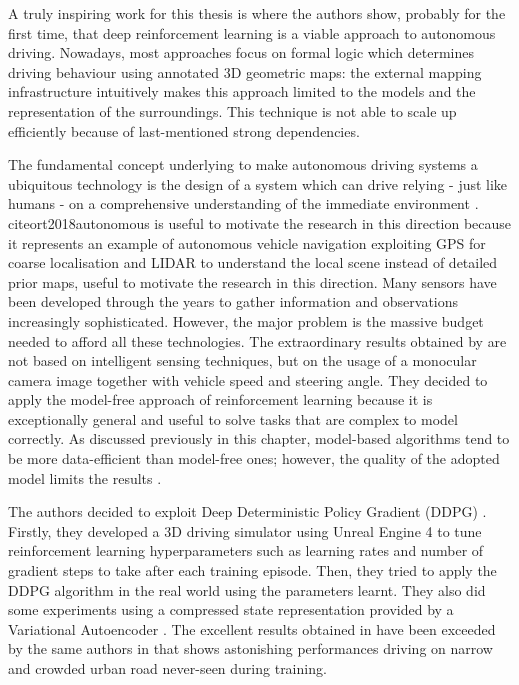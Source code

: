A truly inspiring work for this thesis is \cite{kendall2019learning} where the authors show, probably for the first time, that deep reinforcement learning is a viable approach to autonomous driving. Nowadays,  most approaches focus on formal logic which determines driving behaviour using annotated 3D geometric maps: the external mapping infrastructure intuitively makes this approach limited to the models and the representation of the surroundings.
This technique is not able to scale up efficiently because of last-mentioned strong dependencies.

The fundamental concept underlying \cite{kendall2019learning} to make autonomous driving systems a ubiquitous technology is the design of a system which can drive relying - just like humans - on a comprehensive understanding of the immediate environment \cite{badrinarayanan2017segnet}.
\\cite{ort2018autonomous} is useful to motivate the research in this direction because it represents an example of autonomous vehicle navigation exploiting GPS for coarse localisation and LIDAR to understand the local scene instead of detailed prior maps, useful to motivate the research in this direction.
Many sensors have been developed through the years to gather information and observations increasingly sophisticated. However, the major problem is the massive budget needed to afford all these technologies.
The extraordinary results obtained by \cite{kendall2019learning} are not based on intelligent sensing techniques, but on the usage of a monocular camera image together with vehicle speed and steering angle.
They decided to apply the model-free approach of reinforcement learning because it is exceptionally general and useful to solve tasks that are complex to model correctly. As discussed previously in this chapter, model-based algorithms tend to be more data-efficient than model-free ones; however, the quality of the adopted model limits the results \cite{deisenroth2011pilco}.

The authors decided to exploit Deep Deterministic Policy Gradient (DDPG) \cite{lillicrap2015continuous}.
Firstly, they developed a 3D driving simulator using Unreal Engine 4 to tune reinforcement learning hyperparameters such as learning rates and number of gradient steps to take after each training episode. Then, they tried to apply the DDPG algorithm in the real world using the parameters learnt. They also did some experiments using a compressed state representation provided by a Variational Autoencoder \cite{kingma2013auto,rezende2014stochastic}.
The excellent results obtained in \cite{kendall2019learning} have been exceeded by the same authors in \cite{wayve2019human} that shows astonishing performances driving on narrow and crowded urban road never-seen during training.

